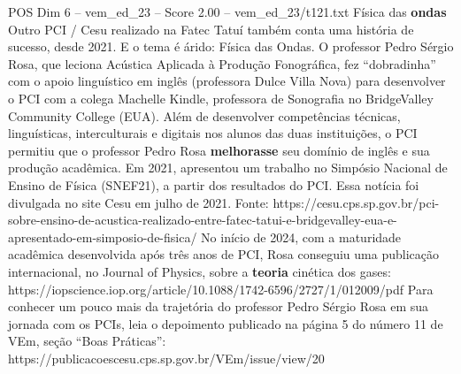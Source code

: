 \begin{textsample}{POS Dim 6 – vem\_ed\_23 – Score 2.00 – vem\_ed\_23/t121.txt}  \label{ex:f6_pos_128}
Física das \textbf{ondas} Outro PCI / Cesu realizado na Fatec Tatuí também conta uma história de sucesso, desde 2021.
E o tema é árido: Física das Ondas.
O professor Pedro Sérgio Rosa, que leciona Acústica Aplicada à Produção Fonográfica, fez “dobradinha” com o apoio linguístico em inglês (professora Dulce Villa Nova) para desenvolver o PCI com a colega Machelle Kindle, professora de Sonografia no BridgeValley Community College (EUA).
Além de desenvolver competências técnicas, linguísticas, interculturais e digitais nos alunos das duas instituições, o PCI permitiu que o professor Pedro Rosa \textbf{melhorasse} seu domínio de inglês e sua produção acadêmica.
Em 2021, apresentou um trabalho no Simpósio Nacional de Ensino de Física (SNEF21), a partir dos resultados do PCI.
Essa notícia foi divulgada no site Cesu em julho de 2021.
Fonte: https://cesu.cps.sp.gov.br/pci-sobre-ensino-de-acustica-realizado-entre-fatec-tatui-e-bridgevalley-eua-e-apresentado-em-simposio-de-fisica/ No início de 2024, com a maturidade acadêmica desenvolvida após três anos de PCI, Rosa conseguiu uma publicação internacional, no Journal of Physics, sobre a \textbf{teoria} cinética dos gases: https://iopscience.iop.org/article/10.1088/1742-6596/2727/1/012009/pdf Para conhecer um pouco mais da trajetória do professor Pedro Sérgio Rosa em sua jornada com os PCIs, leia o depoimento publicado na página 5 do número 11 de VEm, seção “Boas Práticas”: https://publicacoescesu.cps.sp.gov.br/VEm/issue/view/20

\end{textsample}
